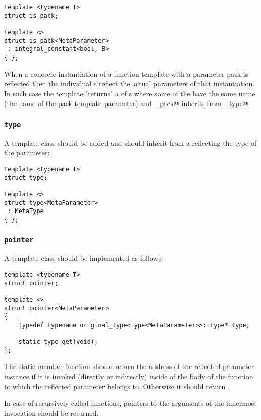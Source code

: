 \begin{verbatim}
template <typename T>
struct is_pack;

template <>
struct is_pack<MetaParameter>
 : integral_constant<bool, B>
{ };
\end{verbatim}

When a concrete instantiation of a function template with a parameter pack
is reflected then the individual s reflect the actual parameters
of that instantiation. In such case the \verb@parameters@ template "returns"
a  of s where some of the 
have the same name (the name of the pack template parameter)
and \verb@is_pack@ inherits from \verb@true_type@.

\subsubsection{\texttt{type}}

A template class \verb@type@ should be added and should inherit
from a  reflecting the type of the parameter:

\begin{verbatim}
template <typename T>
struct type;

template <>
struct type<MetaParameter>
 : MetaType
{ };
\end{verbatim}

\subsubsection{\texttt{pointer}}

A template class \verb@pointer@ should be implemented as follows:

\begin{verbatim}
template <typename T>
struct pointer;

template <>
struct pointer<MetaParameter>
{
	typedef typename original_type<type<MetaParameter>>::type* type;

	static type get(void);
};
\end{verbatim}

The static member function \verb@get@ should return the address of the reflected parameter
instance if it is invoked (directly or indirectly) inside of the body of the function to which
the reflected parameter belongs to. Otherwise it should return \verb@nullptr@.

In case of recursively called functions, pointers to the arguments of the innermost
invocation should be returned.
